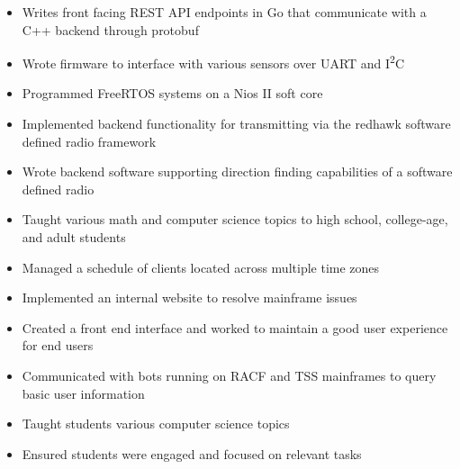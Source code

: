 \documentclass[10pt,a4paper,ragged2e,withhyper]{altacv}
\begin{document}
\begin{paracol}{2}


\begin{itemize}
\item Writes front facing REST API endpoints in Go that communicate with a C++ backend through protobuf
\item Wrote firmware to interface with various sensors over UART and I\textsuperscript{2}C
\item Programmed FreeRTOS systems on a Nios II soft core
\item Implemented backend functionality for transmitting via the redhawk software defined radio framework
\item Wrote backend software supporting direction finding capabilities of a software defined radio
\end{itemize}

\divider{}

\begin{itemize}
\item Taught various math and computer science topics to high school, college-age, and adult students
\item Managed a schedule of clients located across multiple time zones
\end{itemize}

\divider{}

\begin{itemize}
\item Implemented an internal website to resolve mainframe issues
\item Created a front end interface and worked to maintain a good user experience for end users
\item Communicated with bots running on RACF and TSS mainframes to query basic user information
\end{itemize}


\begin{itemize}
\item Taught students various computer science topics
\item Ensured students were engaged and focused on relevant tasks
\end{itemize}


\end{paracol}
\end{document}
